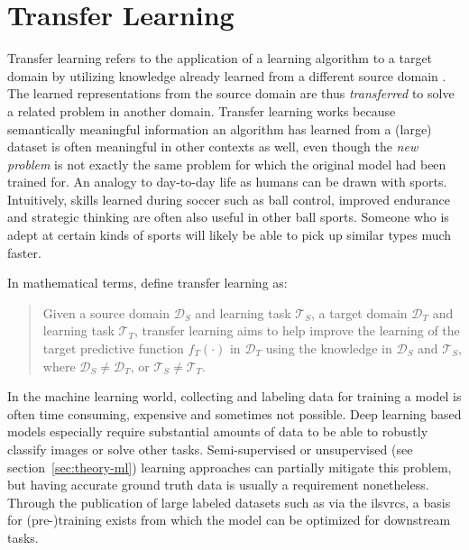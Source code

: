 \documentclass[draft,final]{vutinfth} %
\begin{document}
\section{Transfer Learning}
\label{sec:background-transfer-learning}

Transfer learning refers to the application of a learning algorithm to
a target domain by utilizing knowledge already learned from a
different source domain \cite{zhuang2021}. The learned representations
from the source domain are thus \emph{transferred} to solve a related
problem in another domain. Transfer learning works because
semantically meaningful information an algorithm has learned from a
(large) dataset is often meaningful in other contexts as well, even
though the \emph{new problem} is not exactly the same problem for
which the original model had been trained for. An analogy to
day-to-day life as humans can be drawn with sports. Intuitively,
skills learned during soccer such as ball control, improved endurance
and strategic thinking are often also useful in other ball
sports. Someone who is adept at certain kinds of sports will likely be
able to pick up similar types much faster.

In mathematical terms, \textcite{pan2010} define transfer learning as:

\begin{quote}{\cite[p.1347]{pan2010}}
  Given a source domain $\mathcal{D}_{S}$ and learning task
  $\mathcal{T}_{S}$, a target domain $\mathcal{D}_{T}$ and learning task
  $\mathcal{T}_{T}$, transfer learning aims to help improve the learning of the
  target predictive function $f_{T}(\cdot)$ in $\mathcal{D}_{T}$ using the knowledge
  in $\mathcal{D}_{S}$ and $\mathcal{T}_{S}$, where $\mathcal{D}_{S}\neq\mathcal{D}_{T}$, or $\mathcal{T}_{S}\neq\mathcal{T}_{T}$.
\end{quote}

In the machine learning world, collecting and labeling data for
training a model is often time consuming, expensive and sometimes not
possible. Deep learning based models especially require substantial
amounts of data to be able to robustly classify images or solve other
tasks. Semi-supervised or unsupervised (see
section~\ref{sec:theory-ml}) learning approaches can partially
mitigate this problem, but having accurate ground truth data is
usually a requirement nonetheless. Through the publication of large
labeled datasets such as via the \glspl{ilsvrc}, a basis for
(pre-)training exists from which the model can be optimized for
downstream tasks.
\end{document}
